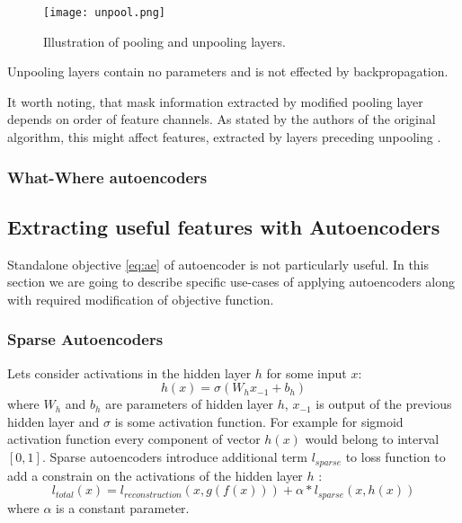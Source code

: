 \begin{figure}[h!]
  \centering
    \texttt{[image: unpool.png]}
  \caption{Illustration of pooling and unpooling layers.}
  \label{fig:unpool}
\end{figure}

Unpooling layers contain no parameters and is not effected by backpropagation.

It worth noting, that mask information extracted by modified pooling layer depends on order of feature channels. As stated by the authors of the original algorithm, this might affect features, extracted by layers preceding unpooling \cite{Zhao2015}.

\subsubsection{What-Where autoencoders}



\subsection{Extracting useful features with Autoencoders}\label{ch:sae}

Standalone objective \ref{eq:ae} of autoencoder is not particularly useful.
In this section we are going to describe specific use-cases of applying autoencoders along with required modification of objective function.

\subsubsection{Sparse Autoencoders}\label{ch:sae}

Lets consider activations in the hidden layer $h$ for some input $x$:
\begin{equation}
  h(x) = \sigma(W_{h}x_{-1} + b_{h})
\end{equation}
where $W_h$ and $b_h$ are parameters of hidden layer $h$, $x_{-1}$ is output of the previous hidden layer and $\sigma$ is some activation function.
For example for sigmoid activation function every component of vector $h(x)$ would belong to interval $[0, 1]$.
Sparse autoencoders introduce additional term $l_{sparse}$ to loss function to add a constrain on the activations of the hidden layer $h$ \cite{Ng2011}:
\begin{equation}
  l_{total}(x) = l_{reconstruction}(x, g(f(x))) + \alpha*l_{sparse}(x, h(x))
\end{equation}
where $\alpha$ is a constant parameter.

